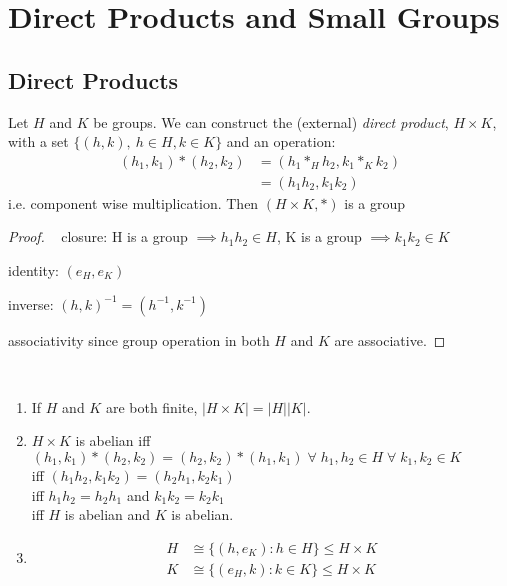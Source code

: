 \section{Direct Products and Small Groups}

\subsection{Direct Products}

\begin{definition}
  Let $H$ and $K$ be groups. We can construct the (external) \emph{direct product}, $H \times K$, with a set $\{ (h, k),\ h \in H, k \in K \}$ and an operation:
  \begin{align*}
    (h_1, k_1) * (h_2, k_2) &= (h_1 *_H h_2, k_1 *_K k_2) \\
    &= (h_1 h_2, k_1 k_2)
  \end{align*} i.e. component wise multiplication. 
  Then $(H \times K, *)$ is a group
\end{definition}

\begin{proof} ~
closure: H is a group $\implies h_1 h_2 \in H$, K is a group $\implies k_1 k_2 \in K$

identity: $(e_H, e_K)$

inverse: $(h, k)^{-1} = (h^{-1}, k^{-1})$

associativity since group operation in both $H$ and $K$ are associative.
\end{proof} 

\begin{remark} ~
  \begin{enumerate}
    \item If $H$ and $K$ are both finite, $| H \times K| = |H| |K|$.
    \item $H \times K$ is abelian iff $(h_1, k_1) * (h_2, k_2) = (h_2, k_2) * (h_1, k_1) \; \forall \; h_1, h_2 \in H \; \forall \; k_1, k_2 \in K$ \\
    iff $(h_1 h_2, k_1 k_2) = (h_2 h_1, k_2 k_1)$ \\
    iff $h_1 h_2 = h_2 h_1$ and $k_1 k_2 = k_2 k_1$ \\
    iff $H$ is abelian and $K$ is abelian.
    \item \begin{align*}
      H &\cong \{ (h, e_K) : h \in H \} \leq H \times K \\
      K &\cong \{ (e_H, k) : k \in K \} \leq H \times K
    \end{align*}
  \end{enumerate}
\end{remark} 

